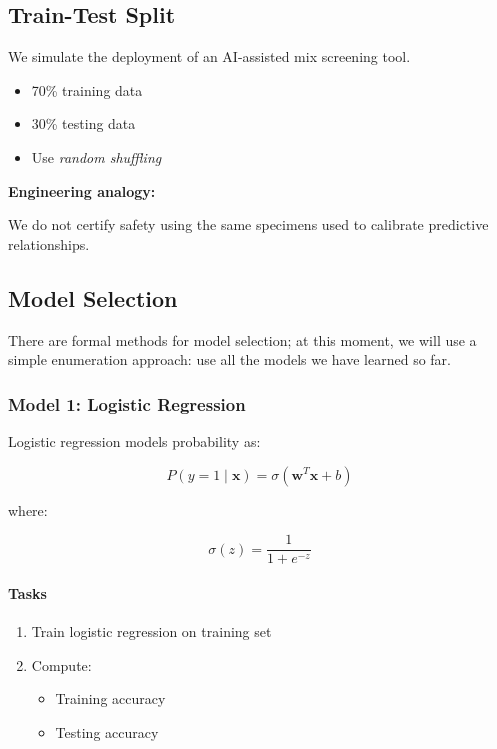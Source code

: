 \documentclass[12pt]{article}
\begin{document}
\subsection*{Train-Test Split}
We simulate the deployment of an AI-assisted mix screening tool.

\begin{itemize}
    \item 70\% training data
    \item 30\% testing data
    \item Use \textit{random shuffling}
\end{itemize}

\textbf{Engineering analogy:}

We do not certify safety using the same specimens used to calibrate predictive relationships.

\subsection*{Model Selection}
There are formal methods for model selection; at this moment, we will use a simple enumeration approach: use all the models we have learned so far. 

\subsubsection*{Model 1: Logistic Regression}

Logistic regression models probability as:

\[
P(y=1 \mid \mathbf{x}) = \sigma(\mathbf{w}^T \mathbf{x} + b)
\]

where:

\[
\sigma(z) = \frac{1}{1 + e^{-z}}
\]

\paragraph{Tasks}

\begin{enumerate}
    \item Train logistic regression on training set
    \item Compute:
    \begin{itemize}
        \item Training accuracy
        \item Testing accuracy
    \end{itemize}
\end{enumerate}
\end{document}
